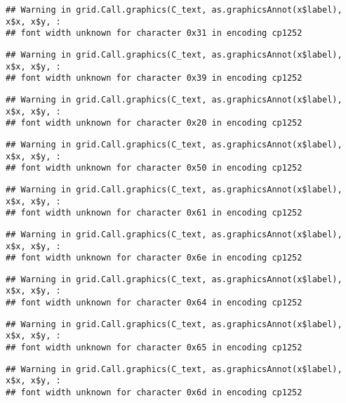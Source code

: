 \documentclass[
]{article}
\begin{document}
\begin{verbatim}
## Warning in grid.Call.graphics(C_text, as.graphicsAnnot(x$label), x$x, x$y, :
## font width unknown for character 0x31 in encoding cp1252
\end{verbatim}

\begin{verbatim}
## Warning in grid.Call.graphics(C_text, as.graphicsAnnot(x$label), x$x, x$y, :
## font width unknown for character 0x39 in encoding cp1252
\end{verbatim}

\begin{verbatim}
## Warning in grid.Call.graphics(C_text, as.graphicsAnnot(x$label), x$x, x$y, :
## font width unknown for character 0x20 in encoding cp1252
\end{verbatim}

\begin{verbatim}
## Warning in grid.Call.graphics(C_text, as.graphicsAnnot(x$label), x$x, x$y, :
## font width unknown for character 0x50 in encoding cp1252
\end{verbatim}

\begin{verbatim}
## Warning in grid.Call.graphics(C_text, as.graphicsAnnot(x$label), x$x, x$y, :
## font width unknown for character 0x61 in encoding cp1252
\end{verbatim}

\begin{verbatim}
## Warning in grid.Call.graphics(C_text, as.graphicsAnnot(x$label), x$x, x$y, :
## font width unknown for character 0x6e in encoding cp1252
\end{verbatim}

\begin{verbatim}
## Warning in grid.Call.graphics(C_text, as.graphicsAnnot(x$label), x$x, x$y, :
## font width unknown for character 0x64 in encoding cp1252
\end{verbatim}

\begin{verbatim}
## Warning in grid.Call.graphics(C_text, as.graphicsAnnot(x$label), x$x, x$y, :
## font width unknown for character 0x65 in encoding cp1252
\end{verbatim}

\begin{verbatim}
## Warning in grid.Call.graphics(C_text, as.graphicsAnnot(x$label), x$x, x$y, :
## font width unknown for character 0x6d in encoding cp1252
\end{verbatim}
\end{document}
